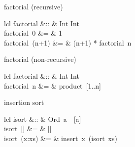 \documentclass[avery5371,grid]{flashcards}
\newcommand{\fl}[2]{\begin{flashcard}{#1}{\begin{array}{lcl}#2\end{array}}\end{flashcard}}
\begin{document}
\fl{factorial (recursive)}{
factorial &:: & Int \rightarrow Int\\
factorial~0 &= & 1\\
factorial~(n+1) &= & (n+1) * factorial~n
}


\fl{factorial (non-recursive)}{
factorial &:: & Int \rightarrow Int\\
factorial~n &= & product~[1..n]}

\fl{insertion sort}{
isort			&::	&	Ord~a~\Rightarrow~[a] \rightarrow [a]\\
isort~[]		&=	&	[]\\
isort~(x:xs)	&=	&	insert~x~(isort~xs)
}

\end{document}

